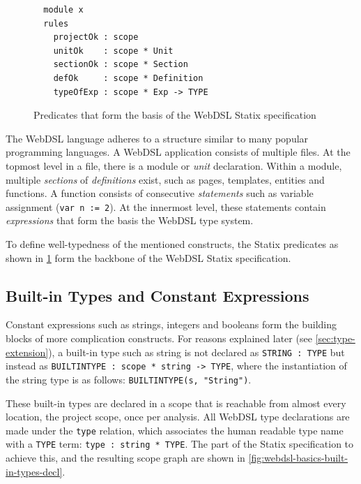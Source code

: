   \begin{figure}
    \vspace{-20pt}
    \capstart
    \begin{verbatim}
  module x
  rules
    projectOk : scope
    unitOk    : scope * Unit
    sectionOk : scope * Section
    defOk     : scope * Definition
    typeOfExp : scope * Exp -> TYPE
    \end{verbatim}
    \caption{\label{fig:webdsl-basic-predicates}Predicates that form the basis of the WebDSL Statix specification}
    \vspace{-10pt}
  \end{figure}

      The WebDSL language adheres to a structure similar to many popular programming languages. A WebDSL application consists of multiple files. At the topmost level in a file, there is a module or \textit{unit} declaration. Within a module, multiple \textit{sections} of \textit{definitions} exist, such as pages, templates, entities and functions. A function consists of consecutive \textit{statements} such as variable assignment (\texttt{var n := 2}). At the innermost level, these statements contain \textit{expressions} that form the basis the WebDSL type system.

      To define well-typedness of the mentioned constructs, the Statix predicates as shown in \cref{fig:webdsl-basic-predicates} form the backbone of the WebDSL Statix specification.

    \subsection{\label{subsec:built-in-types-and-constants}Built-in Types and Constant Expressions}

      Constant expressions such as strings, integers and booleans form the building blocks of more complication constructs. For reasons explained later (see \cref{sec:type-extension}), a built-in type such as string is not declared as \texttt{STRING : TYPE} but instead as \texttt{BUILTINTYPE : scope * string -> TYPE}, where the instantiation of the string type is as follows: \texttt{BUILTINTYPE(s, "String")}.

      These built-in types are declared in a scope that is reachable from almost every location, the project scope, once per analysis. All WebDSL type declarations are made under the \texttt{type} relation, which associates the human readable type name with a \texttt{TYPE} term: \texttt{type : string * TYPE}. The part of the Statix specification to achieve this, and the resulting scope graph are shown in \cref{fig:webdsl-basics-built-in-types-decl}.

